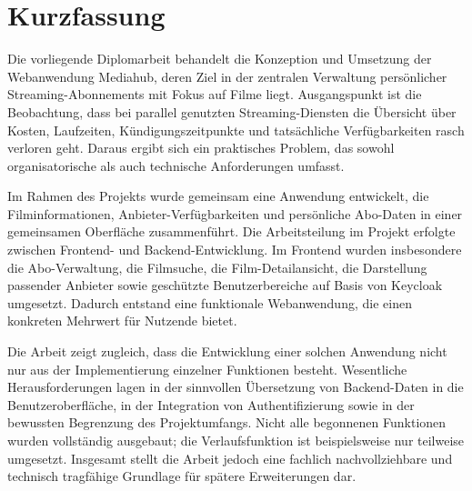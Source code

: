 \chapter*{Kurzfassung}
Die vorliegende Diplomarbeit behandelt die Konzeption und Umsetzung der Webanwendung \glqq Mediahub\grqq{}, deren Ziel in der zentralen Verwaltung pers\"onlicher Streaming-Abonnements mit Fokus auf Filme liegt. Ausgangspunkt ist die Beobachtung, dass bei parallel genutzten Streaming-Diensten die \"Ubersicht \"uber Kosten, Laufzeiten, K\"undigungszeitpunkte und tats\"achliche Verf\"ugbarkeiten rasch verloren geht. Daraus ergibt sich ein praktisches Problem, das sowohl organisatorische als auch technische Anforderungen umfasst.

Im Rahmen des Projekts wurde gemeinsam eine Anwendung entwickelt, die Filminformationen, Anbieter-Verf\"ugbarkeiten und pers\"onliche Abo-Daten in einer gemeinsamen Oberfl\"ache zusammenf\"uhrt. Die Arbeitsteilung im Projekt erfolgte zwischen Frontend- und Backend-Entwicklung. Im Frontend wurden insbesondere die Abo-Verwaltung, die Filmsuche, die Film-Detailansicht, die Darstellung passender Anbieter sowie gesch\"utzte Benutzerbereiche auf Basis von Keycloak umgesetzt. Dadurch entstand eine funktionale Webanwendung, die einen konkreten Mehrwert f\"ur Nutzende bietet.

Die Arbeit zeigt zugleich, dass die Entwicklung einer solchen Anwendung nicht nur aus der Implementierung einzelner Funktionen besteht. Wesentliche Herausforderungen lagen in der sinnvollen \"Ubersetzung von Backend-Daten in die Benutzeroberfl\"ache, in der Integration von Authentifizierung sowie in der bewussten Begrenzung des Projektumfangs. Nicht alle begonnenen Funktionen wurden vollst\"andig ausgebaut; die Verlaufsfunktion ist beispielsweise nur teilweise umgesetzt. Insgesamt stellt die Arbeit jedoch eine fachlich nachvollziehbare und technisch tragf\"ahige Grundlage f\"ur sp\"atere Erweiterungen dar.
